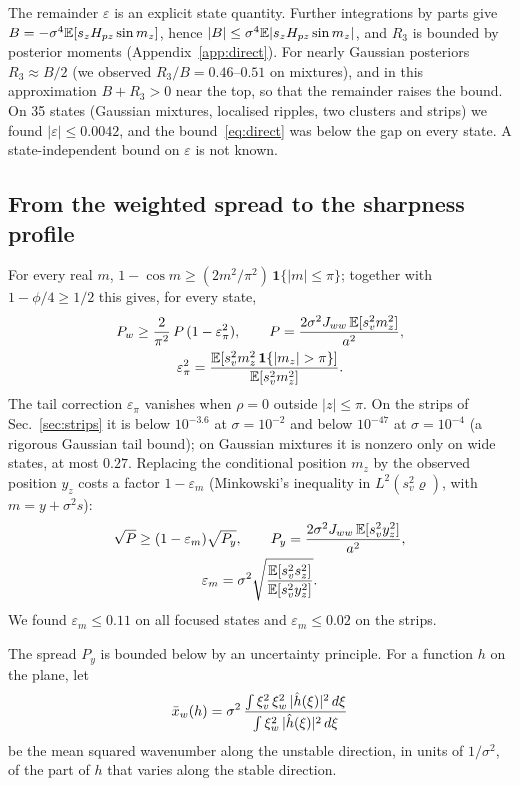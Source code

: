 The remainder $\varepsilon$ is an explicit state quantity. Further integrations by parts give $B = -\sigma^4\mathbb{E}[s_z H_{pz}\sin m_z]$, hence $|B| \leq \sigma^4\mathbb{E}|s_z H_{pz}\sin m_z|$, and $R_3$ is bounded by posterior moments (Appendix~\ref{app:direct}). For nearly Gaussian posteriors $R_3 \approx B/2$ (we observed $R_3/B = 0.46$--$0.51$ on mixtures), and in this approximation $B + R_3 > 0$ near the top, so that the remainder raises the bound. On 35 states (Gaussian mixtures, localised ripples, two clusters and strips) we found $|\varepsilon| \leq 0.0042$, and the bound~\eqref{eq:direct} was below the gap on every state. A state-independent bound on $\varepsilon$ is not known.

\subsection{From the weighted spread to the sharpness profile}

For every real $m$, $1 - \cos m \geq (2m^2/\pi^2)\,\mathbf{1}\{|m| \leq \pi\}$; together with $1 - \phi/4 \geq 1/2$ this gives, for every state,
\begin{gather}
P_w \geq \frac{2}{\pi^2}\,P\,(1 - \varepsilon_\pi^2), \qquad P = \frac{2\sigma^2 J_{ww}\,\mathbb{E}[s_v^2 m_z^2]}{a^2}, \label{eq:PwP}\\
\varepsilon_\pi^2 = \frac{\mathbb{E}[s_v^2 m_z^2\,\mathbf{1}\{|m_z| > \pi\}]}{\mathbb{E}[s_v^2 m_z^2]}. \nonumber
\end{gather}
The tail correction $\varepsilon_\pi$ vanishes when $\rho = 0$ outside $|z| \leq \pi$. On the strips of Sec.~\ref{sec:strips} it is below $10^{-3.6}$ at $\sigma = 10^{-2}$ and below $10^{-47}$ at $\sigma = 10^{-4}$ (a rigorous Gaussian tail bound); on Gaussian mixtures it is nonzero only on wide states, at most $0.27$.
Replacing the conditional position $m_z$ by the observed position $y_z$ costs a factor $1 - \varepsilon_m$ (Minkowski's inequality in $L^2(s_v^2\varrho)$, with $m = y + \sigma^2 s$):
\begin{gather}
\sqrt{P} \geq (1 - \varepsilon_m)\sqrt{P_y}, \qquad P_y = \frac{2\sigma^2 J_{ww}\,\mathbb{E}[s_v^2 y_z^2]}{a^2}, \label{eq:Py}\\
\varepsilon_m = \sigma^2\sqrt{\frac{\mathbb{E}[s_v^2 s_z^2]}{\mathbb{E}[s_v^2 y_z^2]}}. \nonumber
\end{gather}
We found $\varepsilon_m \leq 0.11$ on all focused states and $\varepsilon_m \leq 0.02$ on the strips.

The spread $P_y$ is bounded below by an uncertainty principle. For a function $h$ on the plane, let
\begin{equation}
\bar{x}_w(h) = \sigma^2\,\frac{\int \xi_v^2\,\xi_w^2\,|\hat h(\xi)|^2\,d\xi}{\int \xi_w^2\,|\hat h(\xi)|^2\,d\xi}
\label{eq:xbar}
\end{equation}
be the mean squared wavenumber along the unstable direction, in units of $1/\sigma^2$, of the part of $h$ that varies along the stable direction.

